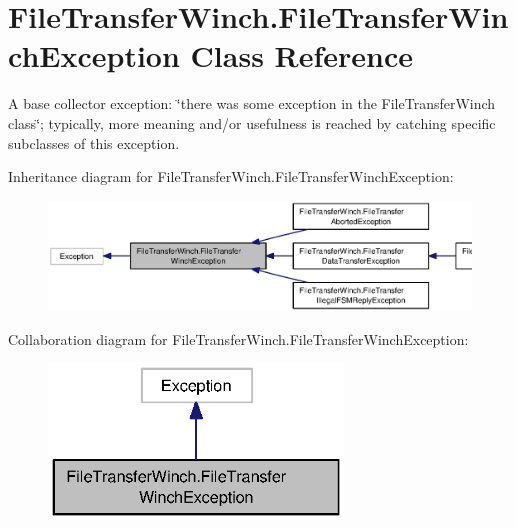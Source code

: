 \section{File\+Transfer\+Winch.\+File\+Transfer\+Winch\+Exception Class Reference}
\label{classorg_1_1smallfoot_1_1filexfer_1_1FileTransferWinch_1_1FileTransferWinchException}


A base collector exception\+: \char`\"{}there was some exception in the File\+Transfer\+Winch class\char`\"{}; typically, more meaning and/or usefulness is reached by catching specific subclasses of this exception.  




Inheritance diagram for File\+Transfer\+Winch.\+File\+Transfer\+Winch\+Exception\+:\nopagebreak
\begin{figure}[H]
\begin{center}
\leavevmode
\includegraphics[width=350pt]{classorg_1_1smallfoot_1_1filexfer_1_1FileTransferWinch_1_1FileTransferWinchException__inherit__graph}
\end{center}
\end{figure}


Collaboration diagram for File\+Transfer\+Winch.\+File\+Transfer\+Winch\+Exception\+:\nopagebreak
\begin{figure}[H]
\begin{center}
\leavevmode
\includegraphics[width=222pt]{classorg_1_1smallfoot_1_1filexfer_1_1FileTransferWinch_1_1FileTransferWinchException__coll__graph}
\end{center}
\end{figure}
